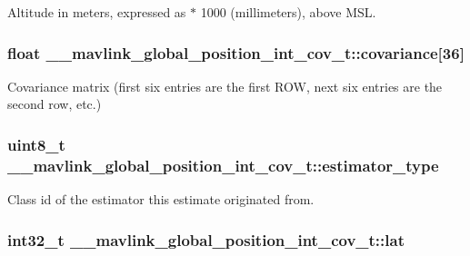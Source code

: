 Altitude in meters, expressed as $\ast$ 1000 (millimeters), above M\+S\+L. 

\hypertarget{struct____mavlink__global__position__int__cov__t_a75970ec38bd2ae98af576c9f6dc696e3}{
\subsubsection[{covariance}]{\setlength{\rightskip}{0pt plus 5cm}float \+\_\+\+\_\+mavlink\+\_\+global\+\_\+position\+\_\+int\+\_\+cov\+\_\+t\+::covariance\mbox{[}36\mbox{]}}}\label{struct____mavlink__global__position__int__cov__t_a75970ec38bd2ae98af576c9f6dc696e3}


Covariance matrix (first six entries are the first R\+O\+W, next six entries are the second row, etc.) 

\hypertarget{struct____mavlink__global__position__int__cov__t_af217c2028212752c8faaddab7ae536a6}{
\subsubsection[{estimator\+\_\+type}]{\setlength{\rightskip}{0pt plus 5cm}uint8\+\_\+t \+\_\+\+\_\+mavlink\+\_\+global\+\_\+position\+\_\+int\+\_\+cov\+\_\+t\+::estimator\+\_\+type}}\label{struct____mavlink__global__position__int__cov__t_af217c2028212752c8faaddab7ae536a6}


Class id of the estimator this estimate originated from. 

\hypertarget{struct____mavlink__global__position__int__cov__t_a4c06e1a0f8238fe546a9b4c570839c4e}{
\subsubsection[{lat}]{\setlength{\rightskip}{0pt plus 5cm}int32\+\_\+t \+\_\+\+\_\+mavlink\+\_\+global\+\_\+position\+\_\+int\+\_\+cov\+\_\+t\+::lat}}\label{struct____mavlink__global__position__int__cov__t_a4c06e1a0f8238fe546a9b4c570839c4e}


